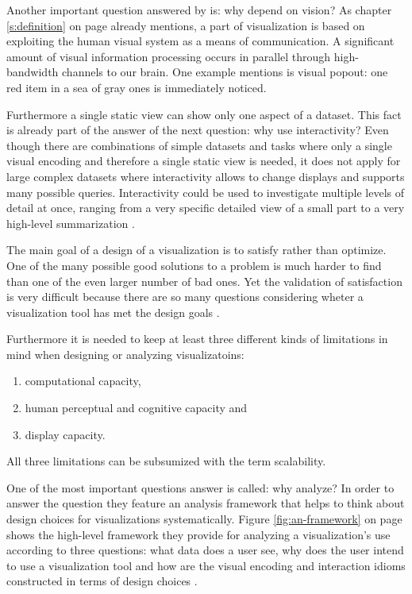 
Another important question answered by \citeauthor{Munzner2014} is: why depend on vision? As chapter \ref{s:definition} on page \pageref{s:definition} already mentions, a part of visualization is based on exploiting the human visual system as a means of communication. A significant amount of visual information processing occurs in parallel through high-bandwidth channels to our brain. One example \citeauthor{Munzner2014} mentions is visual popout: one red item in a sea of gray ones is immediately noticed.

Furthermore a single static view can show only one aspect of a dataset. This fact is already part of the answer of the next question: why use interactivity? Even though there are combinations of simple datasets and tasks where only a single visual encoding and therefore a single static view is needed, it does not apply for large complex datasets where interactivity allows to change displays and supports many possible queries. Interactivity could be used to investigate multiple levels of detail at once, ranging from a very specific detailed view of a small part to a very high-level summarization .

The main goal of a design of a visualization is to satisfy rather than optimize. One of the many possible good solutions to a problem is much harder to find than one of the even larger number of bad ones. Yet the validation of satisfaction is very difficult because there are so many questions considering wheter a visualization tool has met the design goals .

Furthermore it is needed to keep at least three different kinds of limitations in mind when designing or analyzing visualizatoins:
\begin{enumerate}
\item computational capacity,
\item human perceptual and cognitive capacity and
\item display capacity.
\end{enumerate}

All three limitations can be subsumized with the term scalability.

One of the most important questions \citeauthor{Munzner2014} answer is called: why analyze? In order to answer the question they feature an analysis framework that helps to think about design choices for visualizations systematically. Figure \ref{fig:an-framework} on page \pageref{fig:an-framework} shows the high-level framework they provide for analyzing a visualization's use according to three questions: what data does a user see, why does the user intend to use a visualization tool and how are the visual encoding and interaction idioms constructed in terms of design choices .

